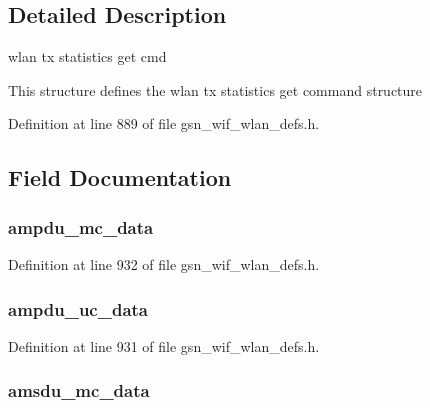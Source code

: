 \subsection{Detailed Description}
wlan tx statistics get cmd 

This structure defines the wlan tx statistics get command structure 

Definition at line 889 of file gsn\_\-wif\_\-wlan\_\-defs.h.



\subsection{Field Documentation}
\hypertarget{a00410_aaba836124f2c72180510420bb1026205}{
\subsubsection[{ampdu\_\-mc\_\-data}]{ {\bf ampdu\_\-mc\_\-data}}}
\label{a00410_aaba836124f2c72180510420bb1026205}


Definition at line 932 of file gsn\_\-wif\_\-wlan\_\-defs.h.

\hypertarget{a00410_a46a7bf629d811ace12ce90ce5654c3f5}{
\subsubsection[{ampdu\_\-uc\_\-data}]{ {\bf ampdu\_\-uc\_\-data}}}
\label{a00410_a46a7bf629d811ace12ce90ce5654c3f5}


Definition at line 931 of file gsn\_\-wif\_\-wlan\_\-defs.h.

\hypertarget{a00410_af88c580daca00ba48fbe3424d29c6578}{
\subsubsection[{amsdu\_\-mc\_\-data}]{ {\bf amsdu\_\-mc\_\-data}}}
\label{a00410_af88c580daca00ba48fbe3424d29c6578}


